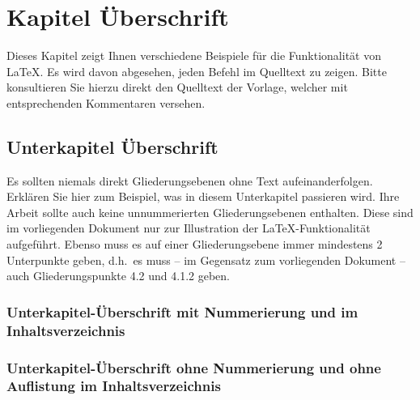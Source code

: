 \documentclass[a4paper,12pt]{scrartcl} %
\begin{document}
\clearpage


\section{Kapitel Überschrift} \label{sec:Section1} %

Dieses Kapitel zeigt Ihnen verschiedene Beispiele für die Funktionalität von \LaTeX. Es wird davon abgesehen, jeden Befehl im Quelltext zu zeigen. Bitte konsultieren Sie hierzu direkt den Quelltext der Vorlage, welcher mit entsprechenden Kommentaren versehen.

\subsection{Unterkapitel Überschrift} %

Es sollten niemals direkt Gliederungsebenen ohne Text aufeinanderfolgen. Erklären Sie hier zum Beispiel, was in diesem Unterkapitel passieren wird. Ihre Arbeit sollte auch keine unnummerierten Gliederungsebenen enthalten. Diese sind im vorliegenden Dokument nur zur Illustration der \LaTeX-Funktionalität aufgeführt. Ebenso muss es auf einer Gliederungsebene immer mindestens 2 Unterpunkte geben, d.h.\ es muss -- im Gegensatz zum vorliegenden Dokument -- auch Gliederungspunkte 4.2 und 4.1.2 geben.

\subsubsection{Unterkapitel-Überschrift mit Nummerierung und im Inhaltsverzeichnis}
\subsubsection*{Unterkapitel-Überschrift ohne Nummerierung und ohne Auflistung im Inhaltsverzeichnis} %
\end{document}
